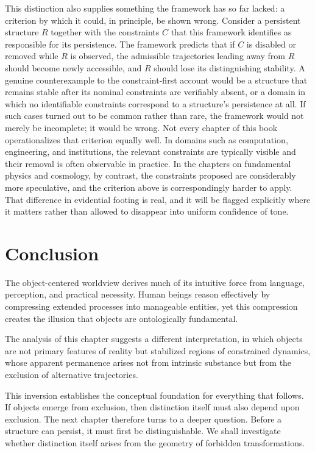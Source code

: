 \documentclass[11pt,oneside]{book}
\theoremstyle{plain}
\theoremstyle{definition}
\theoremstyle{remark}
\begin{document}
This distinction also supplies something the framework has so far lacked: a criterion by which it could, in principle, be shown wrong. Consider a persistent structure \(R\) together with the constraints \(C\) that this framework identifies as responsible for its persistence. The framework predicts that if \(C\) is disabled or removed while \(R\) is observed, the admissible trajectories leading away from \(R\) should become newly accessible, and \(R\) should lose its distinguishing stability. A genuine counterexample to the constraint-first account would be a structure that remains stable after its nominal constraints are verifiably absent, or a domain in which no identifiable constraints correspond to a structure's persistence at all. If such cases turned out to be common rather than rare, the framework would not merely be incomplete; it would be wrong. Not every chapter of this book operationalizes that criterion equally well. In domains such as computation, engineering, and institutions, the relevant constraints are typically visible and their removal is often observable in practice. In the chapters on fundamental physics and cosmology, by contrast, the constraints proposed are considerably more speculative, and the criterion above is correspondingly harder to apply. That difference in evidential footing is real, and it will be flagged explicitly where it matters rather than allowed to disappear into uniform confidence of tone.

\section{Conclusion}

The object-centered worldview derives much of its intuitive force from language, perception, and practical necessity. Human beings reason effectively by compressing extended processes into manageable entities, yet this compression creates the illusion that objects are ontologically fundamental.

The analysis of this chapter suggests a different interpretation, in which objects are not primary features of reality but stabilized regions of constrained dynamics, whose apparent permanence arises not from intrinsic substance but from the exclusion of alternative trajectories.

This inversion establishes the conceptual foundation for everything that follows. If objects emerge from exclusion, then distinction itself must also depend upon exclusion. The next chapter therefore turns to a deeper question. Before a structure can persist, it must first be distinguishable. We shall investigate whether distinction itself arises from the geometry of forbidden transformations.
\end{document}
